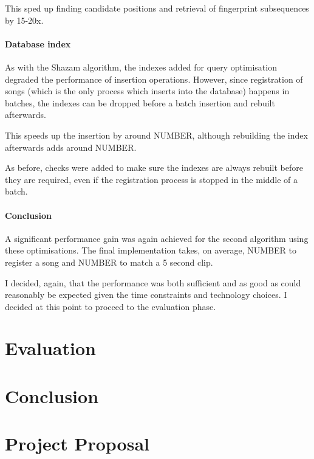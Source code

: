\documentclass[12pt,a4paper,twoside,openright]{report}
\begin{document}
This sped up finding candidate positions and retrieval of fingerprint subsequences by 15-20x.


\subsubsection{Database index}

As with the Shazam algorithm, the indexes added for query optimisation degraded the performance of insertion operations. However, since registration of songs (which is the only process which inserts into the database) happens in batches, the indexes can be dropped before a batch insertion and rebuilt afterwards.

This speeds up the insertion by around NUMBER, although rebuilding the index afterwards adds around NUMBER.

As before, checks were added to make sure the indexes are always rebuilt before they are required, even if the registration process is stopped in the middle of a batch.


\subsubsection{Conclusion}

A significant performance gain was again achieved for the second algorithm using these optimisations. The final implementation takes, on average, NUMBER to register a song and NUMBER to match a 5 second clip. %

I decided, again, that the performance was both sufficient and as good as could reasonably be expected given the time constraints and technology choices. I decided at this point to proceed to the evaluation phase.



\chapter{Evaluation}
\label{evaluation}



\chapter{Conclusion}
\label{conclusion}







\appendix


\chapter{Project Proposal}


\end{document}
